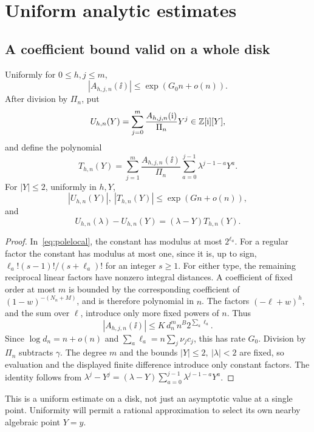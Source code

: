 \section{Uniform analytic estimates}
\label{sec:analysis}

\subsection{A coefficient bound valid on a whole disk}

\begin{lemma}\label{lem:height}
Uniformly for \(0\le h,j\le m\),
\[
|A_{h,j,n}(\ii)|\le \exp(G_0n+o(n)).
\]
After division by \(\Pi_n\), put
\[
U_{h,n}(Y)=\sum_{j=0}^{m}
\frac{A_{h,j,n}(\mathrm{i})}{\Pi_n}Y^j\in\mathbb Z[\mathrm{i}][Y],
\]
and define the polynomial
\[
T_{h,n}(Y)=\sum_{j=1}^{m}\frac{A_{h,j,n}(\ii)}{\Pi_n}
\sum_{a=0}^{j-1}\lambda^{j-1-a}Y^a.
\]
For \(|Y|\le2\), uniformly in \(h,Y\),
\begin{equation}\label{eq:heightbounds}
|U_{h,n}(Y)|,\ |T_{h,n}(Y)|
\le \exp(Gn+o(n)),
\end{equation}
and
\begin{equation}\label{eq:divdiff}
U_{h,n}(\lambda)-U_{h,n}(Y)
=(\lambda-Y)T_{h,n}(Y).
\end{equation}
\end{lemma}
\begin{proof}
In~\eqref{eq:polelocal}, the constant has modulus at most
\(2^{\ell_a}\). For a regular factor the constant has modulus at most
one, since it is, up to sign,
\(\ell_a!(s-1)!/(s+\ell_a)!\) for an integer \(s\ge1\).
For either type, the remaining reciprocal linear factors have
nonzero integral distances. A coefficient of fixed order at most
\(m\) is bounded by the corresponding coefficient of
\((1-w)^{-(N_n+M)}\), and is therefore polynomial in \(n\).
The factors \((-\ell+w)^h\), and the sum over \(\ell\), introduce
only more fixed powers of \(n\).
Thus
\[
|A_{h,j,n}(\ii)|
\le K\,d_n^m n^B 2^{\sum_a\ell_a}.
\]
Since \(\log d_n=n+o(n)\) and
\(\sum_a\ell_a=n\sum_j\nu_jc_j\), this has rate \(G_0\).
Division by \(\Pi_n\) subtracts \(\gamma\).
The degree \(m\) and the bounds \(|Y|\le2,\ |\lambda|<2\) are fixed,
so evaluation and the displayed finite difference introduce only
constant factors. The identity follows from
\(\lambda^j-Y^j=(\lambda-Y)\sum_{a=0}^{j-1}\lambda^{j-1-a}Y^a\).
\end{proof}

This is a uniform estimate on a disk, not just an asymptotic value
at a single point. Uniformity will permit a rational approximation
to select its own nearby algebraic point \(Y=y\).

